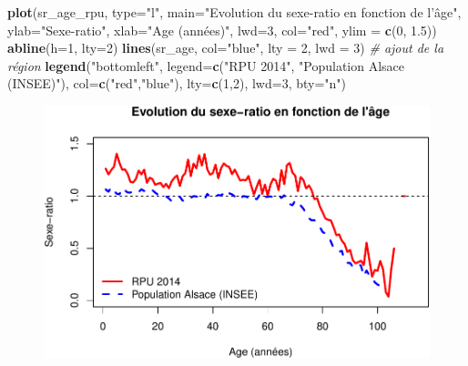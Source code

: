 \documentclass[]{article}
\newenvironment{Shaded}{\begin{snugshade}}{\end{snugshade}}
\newcommand{\KeywordTok}[1]{\textcolor[rgb]{0.13,0.29,0.53}{\textbf{{#1}}}}
\newcommand{\DataTypeTok}[1]{\textcolor[rgb]{0.13,0.29,0.53}{{#1}}}
\newcommand{\DecValTok}[1]{\textcolor[rgb]{0.00,0.00,0.81}{{#1}}}
\newcommand{\FloatTok}[1]{\textcolor[rgb]{0.00,0.00,0.81}{{#1}}}
\newcommand{\StringTok}[1]{\textcolor[rgb]{0.31,0.60,0.02}{{#1}}}
\newcommand{\CommentTok}[1]{\textcolor[rgb]{0.56,0.35,0.01}{\textit{{#1}}}}
\newcommand{\NormalTok}[1]{{#1}}
\begin{document}
\begin{Shaded}
\begin{Highlighting}[]
\KeywordTok{plot}\NormalTok{(sr_age_rpu, }\DataTypeTok{type=}\StringTok{"l"}\NormalTok{, }\DataTypeTok{main=}\StringTok{"Evolution du sexe-ratio en fonction de l'âge"}\NormalTok{, }\DataTypeTok{ylab=}\StringTok{"Sexe-ratio"}\NormalTok{, }\DataTypeTok{xlab=}\StringTok{"Age (années)"}\NormalTok{, }\DataTypeTok{lwd=}\DecValTok{3}\NormalTok{, }\DataTypeTok{col=}\StringTok{"red"}\NormalTok{, }\DataTypeTok{ylim =} \KeywordTok{c}\NormalTok{(}\DecValTok{0}\NormalTok{, }\FloatTok{1.5}\NormalTok{))}
\KeywordTok{abline}\NormalTok{(}\DataTypeTok{h=}\DecValTok{1}\NormalTok{, }\DataTypeTok{lty=}\DecValTok{2}\NormalTok{)}
\KeywordTok{lines}\NormalTok{(sr_age, }\DataTypeTok{col=}\StringTok{"blue"}\NormalTok{, }\DataTypeTok{lty =} \DecValTok{2}\NormalTok{, }\DataTypeTok{lwd =} \DecValTok{3}\NormalTok{) }\CommentTok{# ajout de la région}
\KeywordTok{legend}\NormalTok{(}\StringTok{"bottomleft"}\NormalTok{, }\DataTypeTok{legend=}\KeywordTok{c}\NormalTok{(}\StringTok{"RPU 2014"}\NormalTok{, }\StringTok{"Population Alsace (INSEE)"}\NormalTok{), }\DataTypeTok{col=}\KeywordTok{c}\NormalTok{(}\StringTok{"red"}\NormalTok{,}\StringTok{"blue"}\NormalTok{), }\DataTypeTok{lty=}\KeywordTok{c}\NormalTok{(}\DecValTok{1}\NormalTok{,}\DecValTok{2}\NormalTok{), }\DataTypeTok{lwd=}\DecValTok{3}\NormalTok{, }\DataTypeTok{bty=}\StringTok{"n"}\NormalTok{)}
\end{Highlighting}
\end{Shaded}

\begin{figure}[htbp]
\centering
\includegraphics{./age_files/figure-latex/comp_sex_ratio-1.pdf}
\end{figure}
\end{document}
